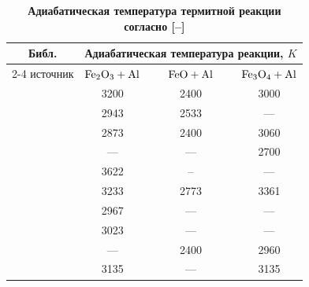 \begin{table}



\small


\setlength{\tabcolsep}{3pt}

\caption*{\bf Адиабатическая температура термитной реакции согласно [--]}%
\vspace{-3mm}
\begin{tabular}{c|c|c|c} \hline
\footnotesize Библ.  & \multicolumn{3}{c}{\footnotesize Адиабатическая температура реакции, $K$}\\ \cline{2-4}
\footnotesize источник &\footnotesize $\rm Fe_2O_3+Al$  &\footnotesize ~~~$\rm FeO + Al$~~~  &\footnotesize $\rm Fe_3O_4+Al$ \\
\hline\footnotesize\rule{0mm}{14pt}%
\!\!\cite{yatc11:bib3}     & 3200            & 2400      & 3000 \\ 
\footnotesize \cite{yatc11:bib5}     & 2943            & 2533      & --- \\ 
\footnotesize \cite{yatc11:bib6}     & 2873            & 2400      & 3060 \\ 
\footnotesize \cite{yatc11:bib7}     & ---              & ---        & 2700 \\ 
\footnotesize \cite{yatc11:bib8,yatc11:bib9}&  3622    & --        & ---   \\ 
\footnotesize \cite{yatc11:bib10}    & 3233            & 2773      & 3361 \\ 
\footnotesize \cite{yatc11:bib12,yatc11:bib13}& 2967   & ---        & ---   \\ 
\footnotesize \cite{yatc11:bib15}    & 3023            & ---        & ---   \\ 
\footnotesize \cite{yatc11:bib16}    & ---              & 2400      & 2960 \\ 
\footnotesize \cite{yatc11:bib17}    & 3135            & ---        & 3135 \\ \hline
\end{tabular}
\end{table}

